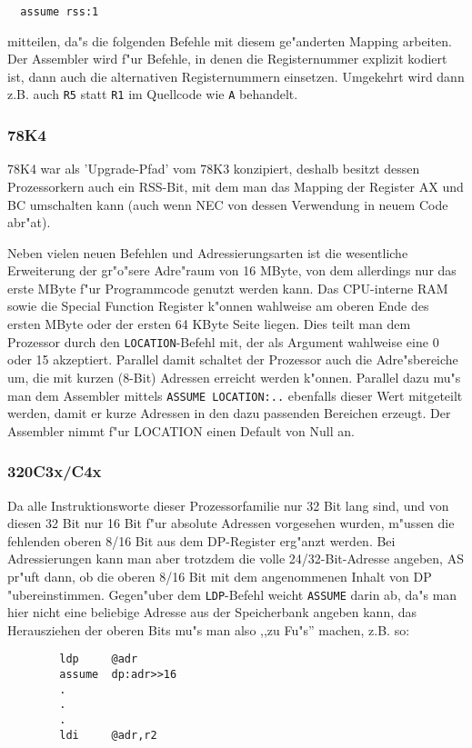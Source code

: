 \documentclass[12pt,a4paper,twoside]{report}
\newcommand{\tty}[1]{{\tt #1}}
\begin{document}
\begin{verbatim}
  assume rss:1
\end{verbatim}

mitteilen, da"s die folgenden Befehle mit diesem ge"anderten Mapping arbeiten.  Der
Assembler wird f"ur Befehle, in denen die Registernummer explizit kodiert ist, dann
auch die alternativen Registernummern einsetzen.  Umgekehrt wird dann z.B. auch
\tty{R5} statt \tty{R1} im Quellcode wie \tty{A} behandelt.


\subsubsection{78K4}

78K4 war als 'Upgrade-Pfad' vom 78K3 konzipiert, deshalb besitzt
dessen Prozessorkern auch ein RSS-Bit, mit dem man das Mapping
der Register AX und BC umschalten kann (auch wenn NEC von dessen
Verwendung in neuem Code abr"at).

Neben vielen neuen Befehlen und Adressierungsarten ist die
wesentliche Erweiterung der gr"o"sere Adre"raum von 16 MByte, von
dem allerdings nur das erste MByte f"ur Programmcode genutzt
werden kann.  Das CPU-interne RAM sowie die Special Function
Register k"onnen wahlweise am oberen Ende des ersten MByte oder
der ersten 64 KByte Seite liegen.  Dies teilt man dem Prozessor
durch den \tty{LOCATION}-Befehl mit, der als Argument wahlweise
eine 0 oder 15 akzeptiert.  Parallel damit schaltet der Prozessor
auch die Adre"sbereiche um, die mit kurzen (8-Bit) Adressen
erreicht werden k"onnen.  Parallel dazu mu"s man dem Assembler
mittels \tty{ASSUME LOCATION:..} ebenfalls dieser Wert mitgeteilt
werden, damit er kurze Adressen in den dazu passenden Bereichen
erzeugt.  Der Assembler nimmt f"ur LOCATION einen Default von Null
an.


\subsubsection{320C3x/C4x}

Da alle Instruktionsworte dieser Prozessorfamilie nur 32 Bit lang
sind, und von diesen 32 Bit nur 16 Bit f"ur absolute Adressen vorgesehen
wurden, m"ussen die fehlenden oberen 8/16 Bit aus dem DP-Register
erg"anzt werden.  Bei Adressierungen kann man aber trotzdem die volle
24/32-Bit-Adresse angeben, AS pr"uft dann, ob die oberen 8/16 Bit mit dem
angenommenen Inhalt von DP "ubereinstimmen.  Gegen"uber dem \tty{LDP}-Befehl
weicht \tty{ASSUME} darin ab, da"s man hier nicht eine beliebige Adresse
aus der Speicherbank angeben kann, das Herausziehen der oberen Bits
mu"s man also ,,zu Fu"s'' machen, z.B. so:
\begin{verbatim}
        ldp     @adr
        assume  dp:adr>>16
        .
        .
        .
        ldi     @adr,r2
\end{verbatim}
\end{document}
